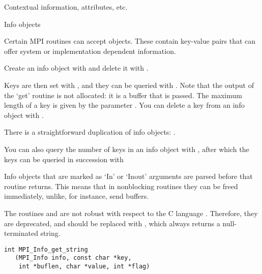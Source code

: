 
\lstset{style=reviewcode,language=C}
 {Contextual information, attributes, etc.}
\label{sec:context}

 {Info objects}
\label{sec:mpi-info}

Certain MPI routines can accept  objects.
These contain key-value pairs that can offer system or implementation
dependent information.

Create an info object with 
and delete it with .

Keys are then set with ,
and they can be queried with .
Note that the output of the `get' routine is not allocated:
it is a buffer that is passed. 
The maximum length of a key is given by the parameter
.
You can delete a key from an info object with .

There is a straightforward duplication of info objects:
.

You can also query the number of keys in an info object with
,
after which the keys can be queried in succession with

Info objects that are marked as `In' or `Inout' arguments
are parsed before that routine returns.
This means that in nonblocking routines they can be freed immediately,
unlike, for instance, send buffers.

\begin{mpifour}
  The routines  and 
  are not robust with respect to the C language .
  Therefore, they are deprecated, and should be replaced with
  , which always returns a null-terminated string.
\begin{lstlisting}
int MPI_Info_get_string
   (MPI_Info info, const char *key, 
    int *buflen, char *value, int *flag)  
\end{lstlisting}
\end{mpifour}

